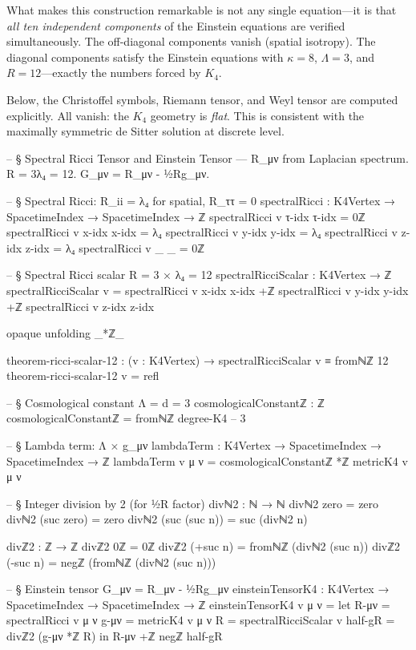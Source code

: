 \documentclass[11pt,a4paper]{book}
\begin{document}
What makes this construction remarkable is not any single equation---it is that \emph{all ten independent components} of the Einstein equations are verified simultaneously. The off-diagonal components vanish (spatial isotropy). The diagonal components satisfy the Einstein equations with $\kappa = 8$, $\Lambda = 3$, and $R = 12$---exactly the numbers forced by $K_4$.

Below, the Christoffel symbols, Riemann tensor, and Weyl tensor are computed explicitly. All vanish: the $K_4$ geometry is \emph{flat}. This is consistent with the maximally symmetric de Sitter solution at discrete level.

\begin{code}
-- § Spectral Ricci Tensor and Einstein Tensor — R_μν from Laplacian spectrum. R = 3λ₄ = 12. G_μν = R_μν - ½Rg_μν.

-- § Spectral Ricci: R_ii = λ₄ for spatial, R_ττ = 0
spectralRicci : K4Vertex → SpacetimeIndex → SpacetimeIndex → ℤ
spectralRicci v τ-idx τ-idx = 0ℤ
spectralRicci v x-idx x-idx = λ₄
spectralRicci v y-idx y-idx = λ₄
spectralRicci v z-idx z-idx = λ₄
spectralRicci v _     _     = 0ℤ

-- § Spectral Ricci scalar R = 3 × λ₄ = 12
spectralRicciScalar : K4Vertex → ℤ
spectralRicciScalar v = spectralRicci v x-idx x-idx +ℤ
                        spectralRicci v y-idx y-idx +ℤ
                        spectralRicci v z-idx z-idx

opaque
  unfolding _*ℤ_

  theorem-ricci-scalar-12 : (v : K4Vertex) → spectralRicciScalar v ≡ fromℕℤ 12
  theorem-ricci-scalar-12 v = refl

-- § Cosmological constant Λ = d = 3
cosmologicalConstantℤ : ℤ
cosmologicalConstantℤ = fromℕℤ degree-K4  -- 3

-- § Lambda term: Λ × g_μν
lambdaTerm : K4Vertex → SpacetimeIndex → SpacetimeIndex → ℤ
lambdaTerm v μ ν = cosmologicalConstantℤ *ℤ metricK4 v μ ν

-- § Integer division by 2 (for ½R factor)
divℕ2 : ℕ → ℕ
divℕ2 zero = zero
divℕ2 (suc zero) = zero
divℕ2 (suc (suc n)) = suc (divℕ2 n)

divℤ2 : ℤ → ℤ
divℤ2 0ℤ = 0ℤ
divℤ2 (+suc n) = fromℕℤ (divℕ2 (suc n))
divℤ2 (-suc n) = negℤ (fromℕℤ (divℕ2 (suc n)))

-- § Einstein tensor G_μν = R_μν - ½Rg_μν
einsteinTensorK4 : K4Vertex → SpacetimeIndex → SpacetimeIndex → ℤ
einsteinTensorK4 v μ ν =
  let R-μν = spectralRicci v μ ν
      g-μν = metricK4 v μ ν
      R    = spectralRicciScalar v
      half-gR = divℤ2 (g-μν *ℤ R)
  in R-μν +ℤ negℤ half-gR


\end{code}
\end{document}
